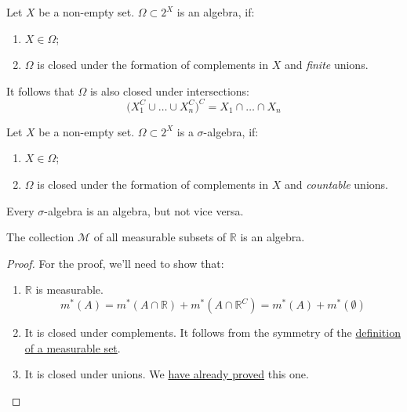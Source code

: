 \pagebreak
\begin{definition}[Algebra]
    Let $X$ be a non-empty set. $\Omega \subset 2^X$ is an algebra,
    if:
    \begin{enumerate}
        \item {
            $X \in \Omega$;
        }
        \item {
            $\Omega$ is closed under the formation of complements in $X$
             and \textit{finite} unions.
        }
    \end{enumerate}
    \begin{remark}
        It follows that $\Omega$ is also closed under intersections:
        \[
            \bigl(X_1^C \cup \dots \cup X_n^C\bigr)^C = X_1 \cap \dots \cap X_n
        \]
    \end{remark}
\end{definition}

\begin{definition}
    Let $X$ be a non-empty set. $\Omega \subset 2^X$ is a $\sigma$-algebra,
    if:
    \begin{enumerate}
        \item {
            $X \in \Omega$;
        }
        \item {
            $\Omega$ is closed under the formation of complements in $X$
             and \textit{countable} unions.
        }
    \end{enumerate}
\end{definition}
\begin{remark}
    Every $\sigma$-algebra is an algebra, but not vice versa.
\end{remark}

\begin{corollary}
    The collection $\mathcal{M}$ of all measurable subsets
     of $\mathbb{R}$ is an algebra.
\end{corollary}
\begin{proof}
    For the proof, we'll need to show that:
    \begin{enumerate}
        \item {
            $\mathbb{R}$ is measurable.
            \[
                m^*(A) = m^*(A \cap \mathbb{R}) + m^*(A \cap \mathbb{R}^C) = 
                m^*(A) + m^*(\emptyset)
            \]
        }
        \item {
            It is closed under complements. It follows from the symmetry of the
            \hyperref[def:measurable]{definition
            of a measurable set}.
        }
        \item {
            It is closed under unions.  We \hyperref[the:measurableUnion]{have already proved} this one.
        }
    \end{enumerate}
\end{proof}

